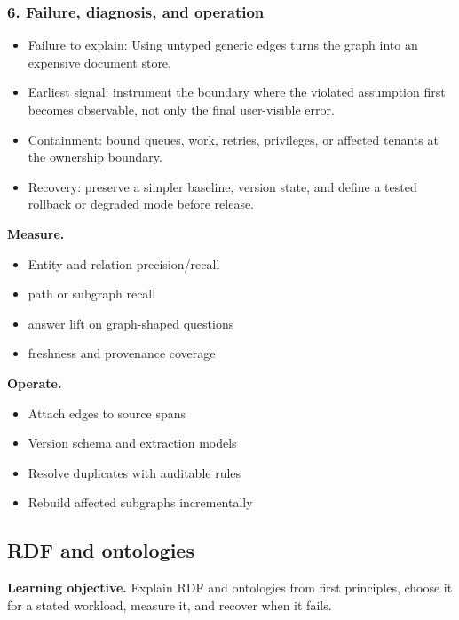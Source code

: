 \subsubsection*{6. Failure, diagnosis, and operation}
\begin{itemize}
\item Failure to explain: Using untyped generic edges turns the graph into an expensive document store.
\item Earliest signal: instrument the boundary where the violated assumption first becomes observable, not only the final user-visible error.
\item Containment: bound queues, work, retries, privileges, or affected tenants at the ownership boundary.
\item Recovery: preserve a simpler baseline, version state, and define a tested rollback or degraded mode before release.
\end{itemize}
\textbf{Measure.}\begin{itemize}
\item Entity and relation precision/recall
\item path or subgraph recall
\item answer lift on graph-shaped questions
\item freshness and provenance coverage
\end{itemize}
\textbf{Operate.}\begin{itemize}
\item Attach edges to source spans
\item Version schema and extraction models
\item Resolve duplicates with auditable rules
\item Rebuild affected subgraphs incrementally
\end{itemize}
\subsection{RDF and ontologies}
\textbf{Learning objective.} Explain RDF and ontologies from first principles, choose it for a stated workload, measure it, and recover when it fails.
